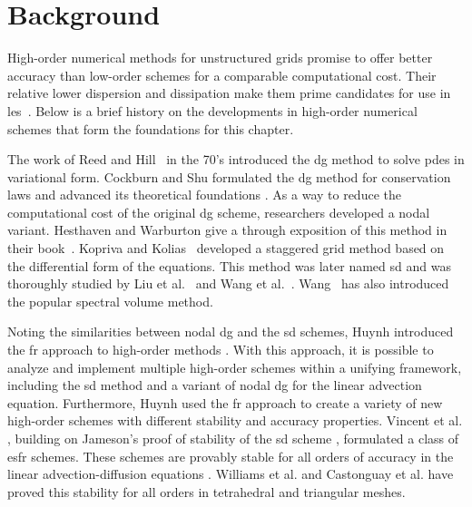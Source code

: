 \section{Background} 
High-order numerical methods for unstructured grids promise to offer better accuracy than low-order schemes for a comparable computational cost. Their relative lower dispersion and dissipation make them prime candidates for use in \gls{les}~\cite{lodato2014structural}. Below is a brief history on the developments in high-order numerical schemes that form the foundations for this chapter.

The work of Reed and Hill~\cite{reed73} in the 70's introduced the \gls{dg} method to solve \gls{pde}s in variational form. Cockburn and Shu formulated the \gls{dg} method for conservation laws and advanced its theoretical foundations \cite{cockburn1989tvbII,cockburn1989tvbIII,cockburn1990rungeIV,cockburn1989runge,cockburn2001runge}. As a way to reduce the computational cost of the original \gls{dg} scheme, researchers developed a nodal variant. Hesthaven and Warburton give a through exposition of this method in their book~\cite{hesthaven2007nodal}. Kopriva and Kolias~\cite{Kopriva96} developed a staggered grid method based on the differential form of the equations. This method was later named \gls{sd} and was thoroughly studied by Liu et al.~\cite{liu2006discontinuous} and Wang et al.~\cite{wang2007spectral}. Wang~\cite{wang2002spectral} has also introduced the popular spectral volume method.

Noting the similarities between nodal \gls{dg} and the \gls{sd} schemes, Huynh introduced the \gls{fr} approach to high-order methods \cite{huynh2007flux,huynh2009reconstruction}. With this approach, it is possible to analyze and implement multiple high-order schemes within a unifying framework, including the \gls{sd} method and a variant of nodal \gls{dg} for the linear advection equation. Furthermore, Huynh used the \gls{fr} approach to create a variety of new high-order schemes with different stability and accuracy properties. Vincent et al. \cite{vincent2011new}, building on Jameson's proof of stability of the \gls{sd} scheme \cite{jameson2010proof}, formulated a class of \gls{esfr} schemes. These schemes are provably stable for all orders of accuracy in the linear advection-diffusion equations \cite{castonguay2013energy}. Williams et al. and Castonguay et al. have proved this stability for all orders in tetrahedral \cite{williams2013tet} and triangular \cite{castonguay2012new,williams2013tri} meshes.

